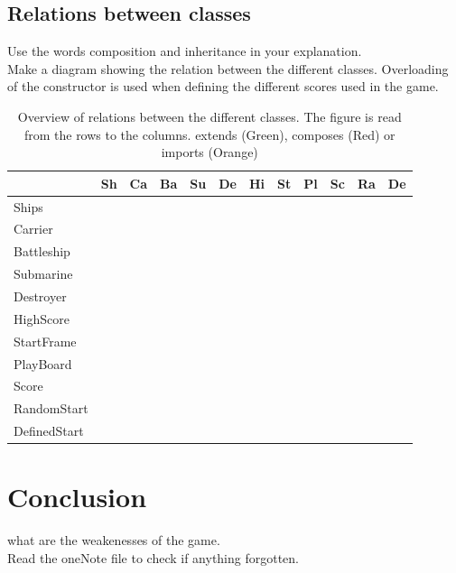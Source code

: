 \documentclass[a4paper,10pt]{article}
\newcommand{\ReplaceMe}[1]{{\color{blue}#1}}
\begin{document}
\subsection{Relations between classes}
\ReplaceMe{Use the words composition and inheritance in your explanation. \\Make a diagram showing the relation between the different classes. Overloading of the constructor is used when defining the different scores used in the game.}
\begin{table}[h!]
	\centering
	
	\begin{tabular}{|p{2cm}|p{1cm}|p{1cm}|p{1cm}|p{1cm}|p{1cm}|p{1cm}|p{1cm}|p{1cm}|p{1cm}|p{1cm}|p{1cm}|}
		\hline
		& \textbf{Sh} & \textbf{Ca}& \textbf{Ba} & \textbf{Su}& \textbf{De} & \textbf{Hi}& \textbf{St} & \textbf{Pl}& \textbf{Sc} & \textbf{Ra}& \textbf{De} \\ \hline
		Ships  &  &  & & & & & & & & & \\ \hline
		Carrier  &  \cellcolor{green!25} &  & & & & & & & & & \\ \hline
		Battleship  &  \cellcolor{green!25} &  & & & & & & & & & \\ \hline
		Submarine  &  \cellcolor{green!25} &  & & & & & & & & & \\ \hline
		Destroyer  &  \cellcolor{green!25} &  & & & & & & & & & \\ \hline
		HighScore  &   &  & & & & & & &\cellcolor{orange!25} & & \\ \hline
		StartFrame  &   &  & & & &\cellcolor{red!25} & & & & & \\ \hline
		PlayBoard  &\cellcolor{red!25}   &  & & & &\cellcolor{red!25} &\cellcolor{orange!25} & & \cellcolor{red!25}& & \\ \hline
		Score  &  \cellcolor{orange!25} &  & & & & & & & & & \\ \hline
		RandomStart  &  \cellcolor{red!25} &  & & & & & & & & & \\ \hline
		DefinedStart  &  \cellcolor{red!25} &  & & & & & & & & & \\ \hline
	\end{tabular}
	\caption{Overview of relations between the different classes. The figure is read from the rows to the columns. extends (Green), composes (Red) or imports (Orange)}
	\label{t:connectionClasses}
\end{table}

\section{Conclusion}
\ReplaceMe{what are the weakenesses of the game.\\ Read the oneNote file to check if anything forgotten.}


















\end{document}
